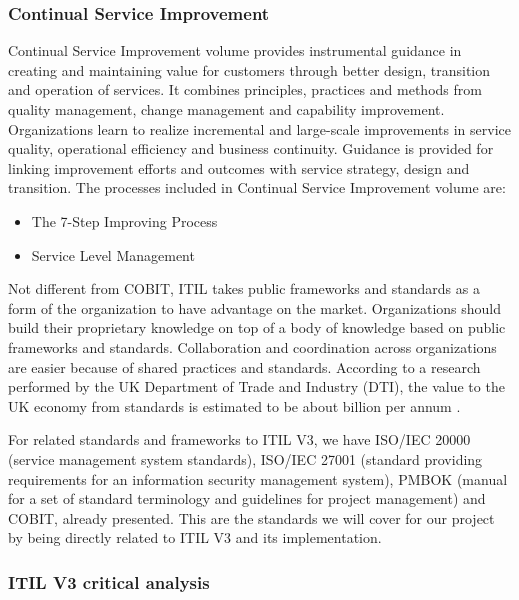 \subsubsection{Continual Service Improvement}

Continual Service Improvement volume provides instrumental guidance in creating and maintaining value for customers through better design, transition and operation of services. It combines principles, practices and methods from quality management, change management and capability improvement. Organizations learn to realize incremental and large-scale improvements in service quality, operational efficiency and business continuity. Guidance is provided for linking improvement efforts and outcomes with service strategy, design and transition.\cite{itilST} The processes included in Continual Service Improvement volume are:

\begin{itemize}
  \item The 7-Step Improving Process
  \item Service Level Management
\end{itemize} 

\par Not different from COBIT,  ITIL takes public frameworks and standards as a form of the organization to have advantage on the market. Organizations should build their proprietary knowledge on top of a body of knowledge based on public frameworks and standards. Collaboration and coordination across organizations are easier because of shared practices and standards. According to a research performed by the UK Department of Trade and Industry (DTI), the value to the UK economy from standards is estimated to be about  billion per annum \cite{McNeillis01112005}.\par
For related standards and frameworks to ITIL V3, we have ISO/IEC 20000 (service management system standards), ISO/IEC 27001 (standard providing requirements for an information security management system), PMBOK (manual for a set of standard terminology and guidelines for project management)\cite{pmbok5} and COBIT\cite{2012cobit}, already presented. This are the standards we will cover for our project by being directly related to ITIL V3 and its implementation.


\subsubsection{ITIL V3 critical analysis}

